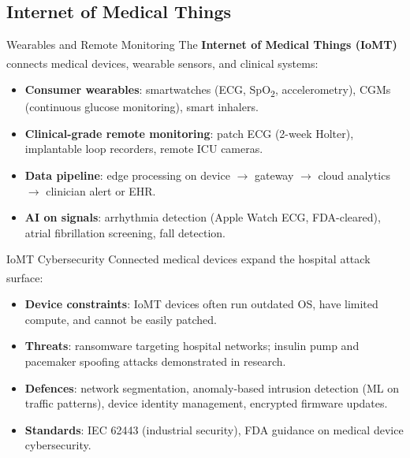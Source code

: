\subsection{Internet of Medical Things}

\begin{v3topic}{Wearables and Remote Monitoring}
    The \textbf{Internet of Medical Things (IoMT)} connects medical devices, wearable sensors, and clinical systems\textsuperscript{\cite[][]{cardonaInternetMedicalThings2021}}:
    \begin{itemize}
        \item \textbf{Consumer wearables}: smartwatches (ECG, SpO\textsubscript{2}, accelerometry), CGMs (continuous glucose monitoring), smart inhalers.
        \item \textbf{Clinical-grade remote monitoring}: patch ECG (2-week Holter), implantable loop recorders, remote ICU cameras.
        \item \textbf{Data pipeline}: edge processing on device $\to$ gateway $\to$ cloud analytics $\to$ clinician alert or EHR.
        \item \textbf{AI on signals}: arrhythmia detection (Apple Watch ECG, FDA-cleared), atrial fibrillation screening, fall detection.
    \end{itemize}

\end{v3topic}
\begin{v3topic}{IoMT Cybersecurity}
    Connected medical devices expand the hospital attack surface\textsuperscript{\cite[][]{cardonaInternetMedicalThings2021}}:
    \begin{itemize}
        \item \textbf{Device constraints}: IoMT devices often run outdated OS, have limited compute, and cannot be easily patched.
        \item \textbf{Threats}: ransomware targeting hospital networks; insulin pump and pacemaker spoofing attacks demonstrated in research.
        \item \textbf{Defences}: network segmentation, anomaly-based intrusion detection (ML on traffic patterns), device identity management, encrypted firmware updates.
        \item \textbf{Standards}: IEC 62443 (industrial security), FDA guidance on medical device cybersecurity.
    \end{itemize}
\end{v3topic}

